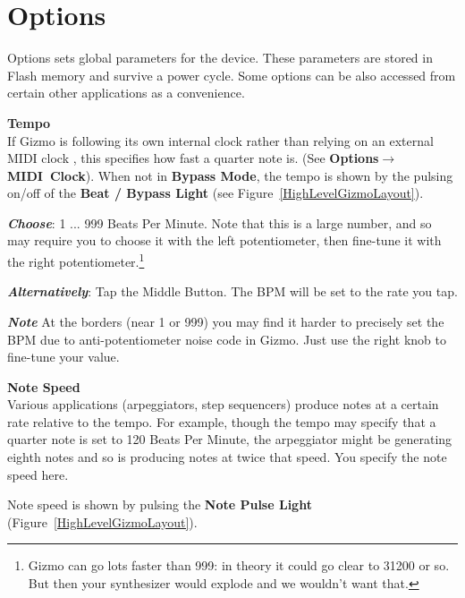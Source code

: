 \documentclass{article}
\begin{document}
\clearpage
\section {Options}
\label{options}

	Options sets global parameters for the device.  These parameters are stored in Flash memory and survive a power cycle.  Some options can be also accessed from certain other applications as a convenience.  
	
	\begin{description}


	\item{\bf Tempo}\\
	If Gizmo is following its own internal clock rather than relying on an external MIDI clock , this specifies how fast a quarter note is.  (See {\bf Options\(\boldsymbol\rightarrow\)MIDI~Clock}).  When not in {\bf Bypass Mode}, the tempo is shown by the pulsing on/off of the {\bf Beat / Bypass Light} (see Figure~\ref{HighLevelGizmoLayout}). 
	
\begin{description}
		\item{\bf \textit{Choose}}: 1 ... 999 Beats Per Minute.  Note that this is a large number, and so may require you to choose it with the left potentiometer, then fine-tune it with the right potentiometer.\footnote{Gizmo can go lots faster than 999: in theory it could go clear to 31200 or so.  But then your synthesizer would explode and we wouldn't want that.}
		\item{\bf \textit{Alternatively}}: Tap the Middle Button.  The BPM will be set to the rate you tap.
   		\item{\bf \textit{Note}} At the borders (near 1 or 999) you may find it harder to precisely set the BPM due to anti-potentiometer noise code in Gizmo. Just use the right knob to fine-tune your value. 
		\end{description}
		
	\item{\bf Note Speed}\\
		Various applications (arpeggiators, step sequencers)
		produce notes at a certain rate relative to the tempo.
		For example, though the tempo may specify that a
		quarter note is set to 120 Beats Per Minute, the 
		arpeggiator might be generating eighth notes and
		so is producing notes at twice that speed.  You specify the 
		note speed here.
		
		Note speed is shown by pulsing the {\bf Note Pulse Light} (Figure~\ref{HighLevelGizmoLayout}).


\end{description}
\end{document}
